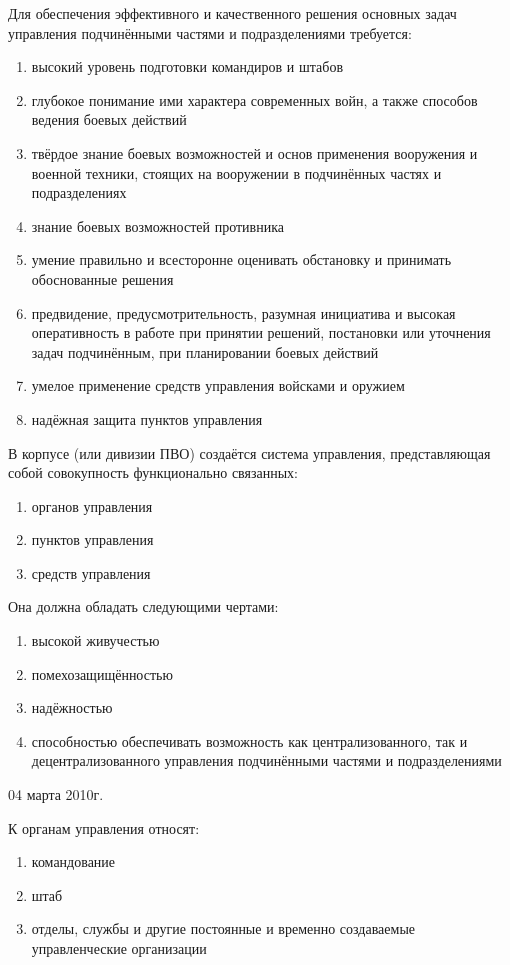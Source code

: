 \documentclass[a4paper,12pt]{article}
\begin{document}
	Для обеспечения эффективного и качественного решения основных задач управления подчинёнными
частями и подразделениями требуется:
	\begin{enumerate}
		\item высокий уровень подготовки командиров и штабов
		\item глубокое понимание ими характера современных войн, а также способов ведения 
		боевых действий
		\item твёрдое знание боевых возможностей и основ применения вооружения и военной 
		техники, стоящих на вооружении в подчинённых частях и подразделениях
		\item знание боевых возможностей противника
		\item умение правильно и всесторонне оценивать обстановку и принимать обоснованные решения
		\item предвидение, предусмотрительность, разумная инициатива и высокая оперативность
		в работе при принятии решений, постановки или уточнения задач подчинённым, при 
		планировании боевых действий
		\item умелое применение средств управления войсками и оружием
		\item надёжная защита пунктов управления
	\end{enumerate}
	В корпусе (или дивизии ПВО) создаётся система управления, представляющая собой совокупность
функционально связанных:
	\begin{enumerate}
		\item органов управления
		\item пунктов управления
		\item средств управления
	\end{enumerate}
	Она должна обладать следующими чертами:
	\begin{enumerate}
		\item высокой живучестью
		\item помехозащищённостью
		\item надёжностью
		\item способностью обеспечивать возможность как централизованного, так и 
		децентрализованного управления подчинёнными частями и подразделениями
	\end{enumerate}
	\newpage
	\centerline{04 марта 2010г.}
	К органам управления относят:
	\begin{enumerate}
		\item командование
		\item штаб
		\item отделы, службы и другие постоянные и временно создаваемые управленческие 
		организации
	\end{enumerate}
\end{document}
